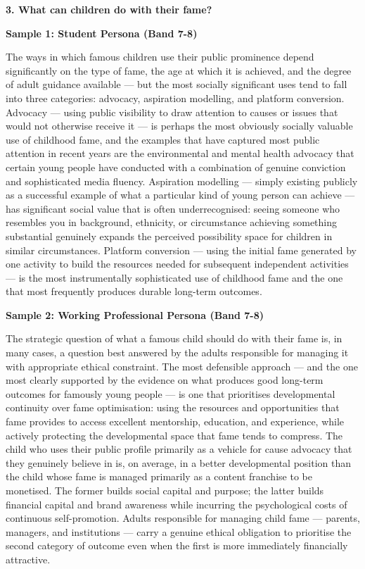 \separator

\begin{ieltsquestion}
\textbf{3. What can children do with their fame?}
\end{ieltsquestion}
\textbf{Sample 1: Student Persona (Band 7-8)}

The ways in which famous children use their public prominence depend significantly on the type of fame, the age at which it is achieved, and the degree of adult guidance available — but the most socially significant uses tend to fall into three categories: advocacy, aspiration modelling, and platform conversion. Advocacy — using public visibility to draw attention to causes or issues that would not otherwise receive it — is perhaps the most obviously socially valuable use of childhood fame, and the examples that have captured most public attention in recent years are the environmental and mental health advocacy that certain young people have conducted with a combination of genuine conviction and sophisticated media fluency. Aspiration modelling — simply existing publicly as a successful example of what a particular kind of young person can achieve — has significant social value that is often underrecognised: seeing someone who resembles you in background, ethnicity, or circumstance achieving something substantial genuinely expands the perceived possibility space for children in similar circumstances. Platform conversion — using the initial fame generated by one activity to build the resources needed for subsequent independent activities — is the most instrumentally sophisticated use of childhood fame and the one that most frequently produces durable long-term outcomes.

\textbf{Sample 2: Working Professional Persona (Band 7-8)}

The strategic question of what a famous child should do with their fame is, in many cases, a question best answered by the adults responsible for managing it with appropriate ethical constraint. The most defensible approach — and the one most clearly supported by the evidence on what produces good long-term outcomes for famously young people — is one that prioritises developmental continuity over fame optimisation: using the resources and opportunities that fame provides to access excellent mentorship, education, and experience, while actively protecting the developmental space that fame tends to compress. The child who uses their public profile primarily as a vehicle for cause advocacy that they genuinely believe in is, on average, in a better developmental position than the child whose fame is managed primarily as a content franchise to be monetised. The former builds social capital and purpose; the latter builds financial capital and brand awareness while incurring the psychological costs of continuous self-promotion. Adults responsible for managing child fame — parents, managers, and institutions — carry a genuine ethical obligation to prioritise the second category of outcome even when the first is more immediately financially attractive.

